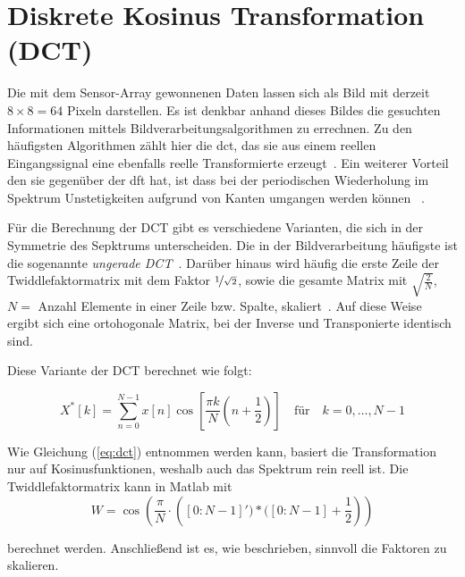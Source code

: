 \section{Diskrete Kosinus Transformation (DCT)}
Die mit dem Sensor-Array gewonnenen Daten lassen sich als Bild mit derzeit $8\times8=64$ Pixeln darstellen. Es ist denkbar anhand dieses Bildes die gesuchten
Informationen mittels Bildverarbeitungsalgorithmen zu errechnen.
Zu den häufigsten Algorithmen zählt hier die \gls{dct}, das sie aus einem reellen Eingangssignal eine ebenfalls reelle Transformierte erzeugt~\autocite[355-359]{burger2006digBildverarbeitung}. 
Ein weiterer Vorteil den sie gegenüber der \gls{dft} hat, ist dass bei der periodischen Wiederholung im Spektrum Unstetigkeiten aufgrund von Kanten umgangen werden können
~\autocite[28-31]{psturm1999bildkompression}.

Für die Berechnung der DCT gibt es verschiedene Varianten, die sich in der Symmetrie des Sepktrums unterscheiden. Die in der Bildverarbeitung häufigste ist 
die sogenannte \textit{ungerade DCT}~\autocite[28-31]{psturm1999bildkompression}.
Darüber hinaus wird häufig die erste Zeile der Twiddlefaktormatrix mit dem Faktor $\nicefrac{1}{\sqrt2}$, sowie die gesamte Matrix mit 
$\sqrt{\frac{2}{N}}$, $N =$ Anzahl Elemente in einer Zeile bzw. Spalte, skaliert~\autocite{wikiDCT}. Auf diese Weise ergibt sich eine ortohogonale Matrix, bei der Inverse und
 Transponierte identisch sind.  

Diese Variante der DCT berechnet wie folgt:

\begin{equation}\label{eq:dct}
X^*[k] = \sum_{n=0}^{N-1} x[n] \cos\left[\frac{\pi k}{N} \left(n+\frac{1}{2}\right) \right] \quad \textrm{für} \quad  k=0,\dots,N-1
\end{equation}

Wie Gleichung (\ref{eq:dct}) entnommen werden kann, basiert die Transformation nur auf Kosinusfunktionen, weshalb auch das Spektrum rein reell ist.
Die Twiddlefaktormatrix kann in Matlab mit
 \begin{equation}\label{eq:matlab_dct_faktoren}
  W = \cos\left(\frac{\pi}{N}\cdot \left([0:N-1]')*([0:N-1]+\frac{1}{2}\right)\right)
 \end{equation}

berechnet werden. Anschließend ist es, wie beschrieben, sinnvoll die Faktoren zu skalieren.